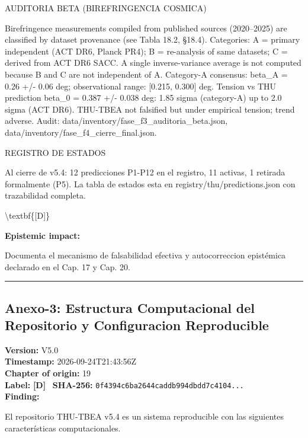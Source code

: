 ﻿\documentclass[11pt,letterpaper]{article}
\begin{document}
AUDITORIA BETA (BIREFRINGENCIA COSMICA)

Birefringence measurements compiled from published sources (2020--2025) are classified by dataset provenance (see Tabla 18.2, §18.4). Categories: A = primary independent (ACT DR6, Planck PR4); B = re-analysis of same datasets; C = derived from ACT DR6 SACC. A single inverse-variance average is not computed because B and C are not independent of A. Category-A consensus: beta\_A = 0.26 +/- 0.06 deg; observational range: [0.215, 0.300] deg. Tension vs THU prediction beta\_0 = 0.387 +/- 0.038 deg: 1.85 sigma (category-A) up to 2.0 sigma (ACT DR6). THU-TBEA not falsified but under empirical tension; trend adverse. Audit: data/inventory/fase\_f3\_auditoria\_beta.json, data/inventory/fase\_f4\_cierre\_final.json.

REGISTRO DE ESTADOS

Al cierre de v5.4: 12 predicciones P1-P12 en el registro, 11 activas, 1 retirada formalmente (P5). La tabla de estados esta en registry/thu/predictions.json con trazabilidad completa.

\textbackslash{}textbf\{[D]\}

\textbf{Epistemic impact:}

Documenta el mecanismo de falsabilidad efectiva y autocorreccion epistémica declarado en el Cap. 17 y Cap. 20.

\vspace{1em}\hrule\vspace{1em}
\subsection*{Anexo-3: Estructura Computacional del Repositorio y Configuracion Reproducible}
\textbf{Version:} V5.0 \\
\textbf{Timestamp:} 2026-09-24T21:43:56Z \\
\textbf{Chapter of origin:} 19 \\
\textbf{Label:} \textcolor{Dgreen}{\textbf{[D]}} \
\textbf{SHA-256:} \texttt{0f4394c6ba2644caddb994dbdd7c4104...} \\[0.5em]
\textbf{Finding:}

El repositorio THU-TBEA v5.4 es un sistema reproducible con las siguientes características computacionales.
\end{document}
